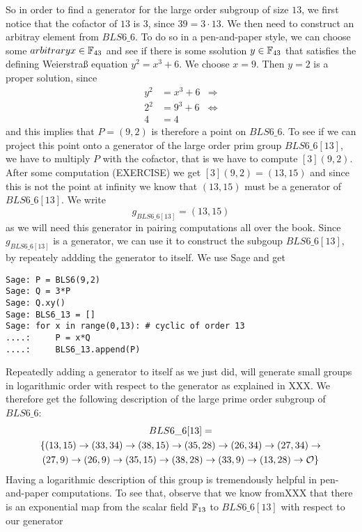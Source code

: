 So in order to find a generator for the large order subgroup of size $13$, we first notice that the cofactor of $13$ is $3$, since $39=3\cdot 13$. We then need to construct an arbitray element from $BLS6\_6$. To do so in a pen-and-paper style, we can choose some $arbitrary x\in\mathbb{F}_{43}$ and see if there is some ssolution $y\in\mathbb{F}_{43}$ that satisfies the defining Weierstraß equation $y^2 = x^3 + 6$. We choose $x=9$. Then $y=2$ is a proper solution, since
\begin{align*}
y^2 & = x^3 + 6 & \Rightarrow \\
2^2 & = 9^3 + 6 & \Leftrightarrow \\
4 & = 4
\end{align*}   
and this implies that $P=(9,2)$ is therefore a point on $BLS6\_6$. To see if we can project this point onto a generator of the large order prim group $BLS6\_6[13]$, we have to multiply $P$ with the cofactor, that is we have to compute $[3](9,2)$. After some computation (EXERCISE) we get $[3](9,2) = (13,15)$ and since this is not the point at infinity we know that $(13,15)$ must be a generator of $BLS6\_6[13]$. We write
\begin{equation}
g_{BLS6\_6[13]} = (13,15)
\end{equation}
as we will need this generator in pairing computations all over the book. Since $g_{BLS6\_6[13]}$ is a generator, we can use it to construct the subgoup $BLS6\_6[13]$, by repeately addding the generator to itself. We use Sage and get
\begin{verbatim}
Sage: P = BLS6(9,2)
Sage: Q = 3*P
Sage: Q.xy()
Sage: BLS6_13 = []
Sage: for x in range(0,13): # cyclic of order 13
....:     P = x*Q
....:     BLS6_13.append(P)
\end{verbatim}
Repeatedly adding a generator to itself as we just did, will generate small groups in logarithmic order with respect to the generator as explained in XXX. We therefore get the following description of the large prime order subgroup of $BLS6\_6$:
\begin{multline}
BLS6\_6[13]=\\
\{(13,15) \rightarrow (33,34) \rightarrow  (38,15) \rightarrow  (35,28) \rightarrow (26,34) \rightarrow  (27,34) \rightarrow  \\ 
(27,9)  \rightarrow  (26,9) \rightarrow  (35,15) \rightarrow  (38,28) \rightarrow  (33,9) \rightarrow (13,28) \rightarrow  \mathcal{O}\}$$
\end{multline}
Having a logarithmic description of this group is tremendously helpful in pen-and-paper computations. To see that, observe that we know fromXXX that there is an exponential map from the scalar field $\mathbb{F}_{13}$ to $BLS6\_6[13]$ with respect to our generator
